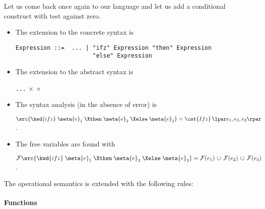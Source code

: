 Let us come back once again to our language and let us add a
conditional construct with test against zero.
\begin{itemize}

  \item The extension to the concrete syntax is
\begin{verbatim}
Expression ::=  ... | "ifz" Expression "then" Expression
                      "else" Expression
\end{verbatim}

  \item The extension to the abstract syntax is

\noindent \Xtype {} \equal \texttt{...} \vbar {} \Xof
{} \(\times\)  \(\times\) 

  \item The syntax analysis (in the absence of error) is

\noindent $\src{\kwd{ifz} \; \meta{e}_1 \; \Xthen \; \meta{e}_2 \;
  \Xelse \; \meta{e}_3} = \cst{Ifz} \, \lpar e_1, e_2, e_3\rpar$.

  \item The free variables are found with

\noindent $\mathcal{F} \src{\kwd{ifz} \; \meta{e}_1 \; \Xthen \;
  \meta{e}_2 \; \Xelse \; \meta{e}_3} = \mathcal{F} (e_1) \, \cup \,
          \mathcal{F} (e_2) \, \cup \, \mathcal{F} (e_3)$.

\end{itemize}
The operational semantics is extended with the following rules:

\paragraph{Functions}

